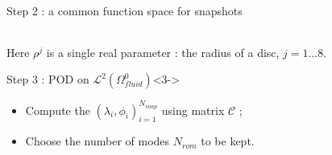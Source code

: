 \begin{frame}
\begin{block}{Step 2 : a common function space for snapshots}
{\begin{center}
\begin{tabular}{|c|c|c|c|}
\\
\hline
\end{tabular}
\end{center}
}
%
\footnotesize{Here $\rho^j$ is a single real parameter : the radius of a disc, $j=1 \dots 8$.}
\end{block}
%
\begin{block}{Step 3 : POD on $\mathcal{L}^2(\Omega_{fluid}^0)$}<3->
\begin{itemize}
\item<+-> Compute the $(\lambda_i,\phi_i)_{i=1}^{N_{snap}}$ using matrix $\mathcal{C}$ ;%
%
%
\item<+-> Choose the number of modes $N_{rom}$ to be kept.%
\end{itemize}
\end{block}
%
\end{frame}

